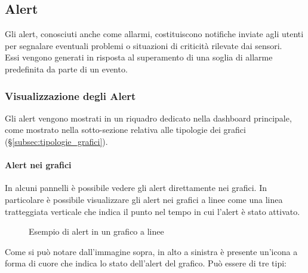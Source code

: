 \subsection{Alert}
Gli alert, conosciuti anche come allarmi, costituiscono notifiche inviate agli utenti per segnalare eventuali problemi o situazioni di criticità rilevate dai sensori.\\
Essi vengono generati in risposta al superamento di una soglia di allarme predefinita da parte di un evento. \\

\subsubsection{Visualizzazione degli Alert}
Gli alert vengono mostrati in un riquadro dedicato nella dashboard principale, come mostrato nella sotto-sezione relativa alle tipologie dei grafici (\S\ref{subsec:tipologie_grafici}). \\

\paragraph{Alert nei grafici}
In alcuni pannelli è possibile vedere gli alert direttamente nei grafici. In particolare è possibile visualizzare gli alert nei grafici a linee come una linea tratteggiata verticale che indica il punto nel tempo in cui l'alert è stato attivato. \\
\begin{figure}[H]
    \centering
    \caption{Esempio di alert in un grafico a linee}
    \label{fig:my_label}
\end{figure}
Come si può notare dall'immagine sopra, in alto a sinistra è presente un'icona a forma di cuore che indica lo stato dell'alert del grafico. Può essere di tre tipi: 

